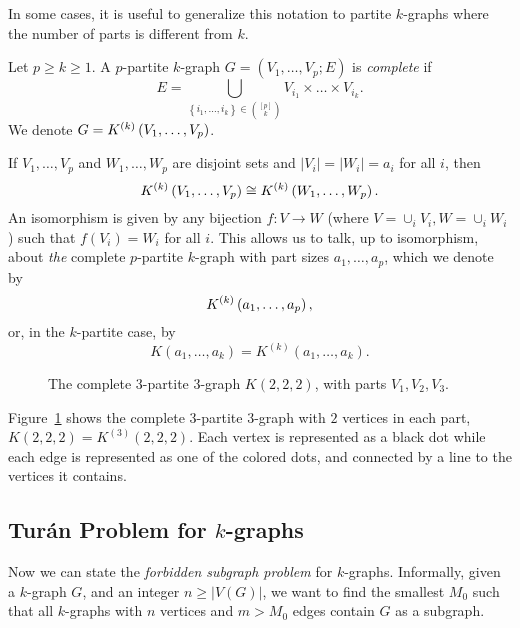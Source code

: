In some cases, it is useful to generalize this notation to partite $k$-graphs
where the number of parts is different from $k$.

\begin{definition}
    Let $p \geq k \geq 1$.
    A $p$-partite $k$-graph $G = (V_1, \dots, V_p; E)$ is \emph{complete} if
    \[
        E = \bigcup_{\left\{i_1, \dots, i_k \right\} \in \binom{[p]}{k}} V_{i_1} \times \dots \times V_{i_k}.
    \]
    We denote $G = K^{(k)}\left(V_1, \dots, V_p\right)$.

\end{definition}

If $V_1, \dots, V_p$ and $W_1, \dots, W_p$ are disjoint sets
and $|V_i| = |W_i| = a_i$ for all $i$, then
\[
    K^{(k)}\left(V_1, \dots, V_p\right) \cong K^{(k)}\left(W_1, \dots, W_p\right).
\]
An isomorphism is given by any bijection $f: V \to W$ (where $V=\cup_i V_i, W=\cup_i W_i$)
such that $f(V_i) = W_i$ for all $i$.
This allows us to talk, up to isomorphism, about \emph{the} complete $p$-partite $k$-graph
with part sizes $a_1, \dots, a_p$, which we denote by
\[
    K^{(k)}\left(a_1, \dots, a_p\right),
\]
or, in the $k$-partite case, by
\[
    K(a_1, \dots, a_k) = K^{(k)}(a_1, \dots, a_k).
\]

\begin{figure}[htbp]
    \centering
    
    \caption{The complete 3-partite 3-graph $K(2, 2, 2)$, with parts $V_1, V_2, V_3$.}
    \label{fig:222}
\end{figure}

Figure~\ref{fig:222} shows the complete $3$-partite $3$-graph
with $2$ vertices in each part, $K(2, 2, 2) = K^{(3)}(2, 2, 2)$.
Each vertex is represented as a black dot while
each edge is represented as one of the colored dots, and connected by a line to the vertices it contains.




\subsection{Turán Problem for $k$-graphs}\label{subsec:turan}

Now we can state the \emph{forbidden subgraph problem} for $k$-graphs.
Informally, given a $k$-graph $G$, and an integer $n \geq |V(G)|$,
we want to find the smallest $M_0$ such that all $k$-graphs with $n$ vertices and $m > M_0$ edges
contain $G$ as a subgraph.

